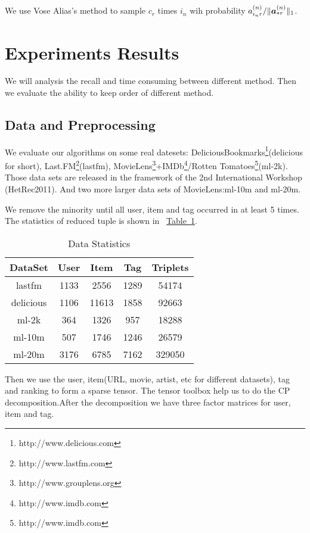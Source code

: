 \documentclass[letterpaper]{article}
\newcommand{\Sca}[3]{{#1}^{(#2)}_{i_#2#3}}%
\newcommand{\V}[1]{{\bm{{\MakeLowercase{#1}}}}}
\newcommand{\VnC}[3]{\V{#1}^{(#2)}_{#3}}
\newcommand{\Nrocl}[2]{\norm{\VnC{a}{#1}{*#2}}{1}}
\newcommand{\norm}[2]{\|#1\|_{#2}}
\newcommand{\Table}[1] {\hyperref[table:#1] {Table~\ref*{table:#1}}} %
\begin{document}
We use Vose Alias's method to sample $c_r$ times $i_n$ wih probability ${\Sca{a}{n}{r}}/\Nrocl{n}{r}$.

\section{Experiments Results}
We will analysis the recall and time consuming  between different method. Then we evaluate the ability to keep order of different method.

\subsection{Data and Preprocessing}
We evaluate our algorithms on some real datesets:
DeliciousBookmarks\footnote{http://www.delicious.com
}(delicious for short),
Last.FM\footnote{http://www.lastfm.com}(lastfm),
MovieLens\footnote{http://www.grouplens.org}+IMDb\footnote{http://www.imdb.com }/Rotten Tomatoes\footnote{http://www.imdb.com}(ml-2k).
Those data sets are released in the framework of the 2nd International Workshop (HetRec2011)\cite{Cantador:RecSys2011}.
And two more larger data sets of MovieLens\cite{Harper2015}:ml-10m and ml-20m.

We remove the minority until all user, item and tag occurred in at least 5 times. The statistics of reduced tuple is shown in ~\Table{Data}.

\begin{table}[ht]
  \label{table:Data}
  \centering
  \begin{tabular}{|c|c|c|c|c|}
    \hline
    DataSet & User & Item & Tag & Triplets \\
    \hline
    lastfm      & 1133 &  2556   &  1289  &  54174   \\
    delicious   & 1106 &  11613  &  1858  &  92663   \\
    ml-2k       & 364  &  1326   &  957   &  18288   \\
    ml-10m      & 507  &  1746   &  1246  &  26579   \\
    ml-20m      & 3176 &  6785   &  7162  &  329050  \\
    \hline
  \end{tabular}
  \caption{Data Statistics}
\end{table}
Then we use the user, item(URL, movie, artist, etc for different datasets), tag and ranking to form a sparse tensor\cite{TTB_Sparse}. The tensor toolbox\cite{TTB_Software} help us to do the CP decomposition.After the decomposition we have three factor matrices for user, item and tag.
\end{document}
